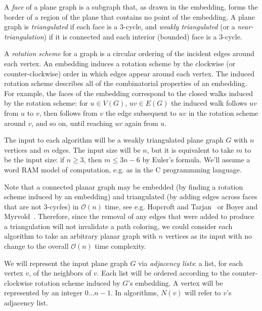 \documentclass[12pt,letterpaper]{article}
\theoremstyle{plain}
\theoremstyle{definition}
\theoremstyle{break}
\newcommand{\defterm}[1]{\emph{#1}} %
\begin{document}
A \defterm{face} of a plane graph is a subgraph that,
as drawn in the embedding,
forms the border of a region of the plane
that contains no point of the embedding.
A plane graph is \defterm{triangulated}
if each face is
a $3$-cycle, and \defterm{weakly triangulated} (or a \defterm{near-triangulation})
if it is connected and each interior (bounded) face is a $3$-cycle.

A \defterm{rotation scheme} for a graph
is a circular ordering of the incident edges
around each vertex. An
embedding induces a rotation scheme by the clockwise
(or counter-clockwise) order in which
edges appear around each vertex.
The induced rotation scheme describes all of the combinatorial
properties of an embedding. For example, the faces of the embedding
correspond to the closed walks induced by the rotation
scheme: for $u\in V(G)$, $uv\in E(G)$ the induced walk
follows $uv$ from $u$ to $v$, then follows from $v$ the edge subsequent to
$uv$ in the rotation scheme around $v$,
and so on, until reaching $uv$ again from $u$.

The input to each algorithm will be a weakly triangulated
plane graph $G$ with $n$ vertices and $m$ edges.
The input size will be $n$, but it is equivalent to take
$m$ to be the input size:
if $n\ge 3$, then $m\le 3n-6$ by Euler's formula. We'll
assume a word RAM model of computation,
e.g. as in the C programmming language.

Note that a connected planar graph may be
embedded (by finding a rotation scheme induced by an embedding) and
triangulated (by adding edges across faces that are not $3$-cycles)
in $\mathcal{O}(n)$ time, see e.g. Hopcroft
and Tarjan~\cite{Hop1974} or Boyer and
Myrvold~\cite{BoMy2004}. Therefore, since the removal of any edges that
were added
to produce a triangulation will not invalidate a
path coloring,
we could consider each algorithm
to take an arbitrary planar graph with $n$ vertices as its input
with no change to the overall $\mathcal{O}(n)$ time complexity.

We will represent the input plane graph $G$ via \textit{adjacency lists}:
a list, for each vertex $v$, of the neighbors of $v$. Each
list will be ordered according to
the counter-clockwise rotation scheme induced by $G$'s embedding.
A vertex will be represented by an integer $0\dots n-1$.
In algorithms, $N(v)$ will refer to $v$'s adjacency list.
\end{document}
